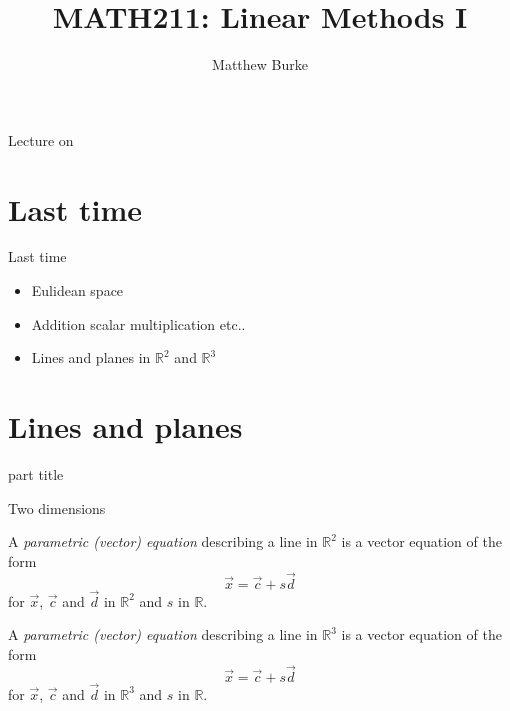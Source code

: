 \documentclass{beamer}
\title{MATH211: Linear Methods I}
\author{Matthew Burke}
\date{\lectureDate}
\newcommand{\lectureDate}{\formatdate{11}{10}{2018}}
\begin{document}
\frame{\titlepage}

\begin{frame}{Lecture on \lectureDate}
  \tableofcontents
\end{frame}

\section*{Last time}
\label{sec:Last-time}

\begin{frame}{Last time}
  \begin{itemize}
  \item Eulidean space\vfill
  \item Addition scalar multiplication etc..\vfill
  \item Lines and planes in $\mathbb R^2$ and $\mathbb R^3$
  \end{itemize}
\end{frame}

\section{Lines and planes}

\begin{frame}
  \begin{beamercolorbox}[sep=12pt,center]{part title}
    \insertsection\par
  \end{beamercolorbox}
\end{frame}


\begin{frame}{Two dimensions}
  \begin{definition}
    A \emph{parametric (vector) equation} describing a line in $\mathbb R^2$ is a vector equation of the form
    \begin{equation*}
      \vec{x} = \vec{c}+s\vec{d}
    \end{equation*}
    for $\vec{x}$, $\vec{c}$ and $\vec{d}$ in $\mathbb R^2$ and $s$ in $\mathbb R$.
  \end{definition}\vfill
  \begin{definition}
    A \emph{parametric (vector) equation} describing a line in $\mathbb R^3$ is a vector equation of the form
    \begin{equation*}
      \vec{x} = \vec{c}+s\vec{d}
    \end{equation*}
    for $\vec{x}$, $\vec{c}$ and $\vec{d}$ in $\mathbb R^3$ and $s$ in $\mathbb R$.
  \end{definition}
\end{frame}
\end{document}
